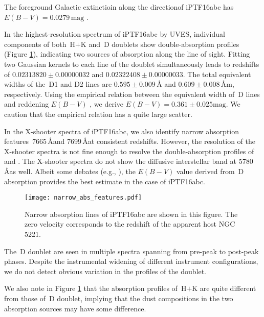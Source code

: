 \documentclass[twocolumn]{aastex61}
\begin{document}
The foreground Galactic extinctioin along the directionof iPTF16abc
has $E(B-V)=0.0279\,\textrm{mag}$ \citep{2011ApJ...737..103S}.

In the highest-resolution spectrum of iPTF16abc by UVES, individual
components of both \,H$+$K and \,D doublets show
double-absorption profiles (Figure \ref{fig:narrow_features}),
indicating two sources of absorption along the line of sight. Fitting
two Gaussian kernels to each line of the  doublet
simultaneously leads to redshifts of $0.02313820\pm0.00000032$ and
$0.02322408\pm0.00000033$. The total equivalent widths of the
\,D1 and D2 lines are $0.595\pm0.009\,\textrm{\AA}$ and
$0.609\pm0.008\,\textrm{\AA}$m, respectively. Using the empirical
relation between the equivalent width of \,D lines and
reddening $E(B-V)$ \citep{2012MNRAS.426.1465P}, we derive
$E(B-V)=0.361\pm0.025\textrm{mag}$. We caution that the empirical
relation has a quite large scatter.

In the X-shooter spectra of iPTF16abc, we also identify narrow
absorption features \,7665\,\AA and 7699\,\AA at consistent
redshifts. However, the resolution of the X-shooter spectra is not
fine enough to resolve the double-absorption profiles of 
and . The X-shooter spectra do not show the diffusive
interstellar band at 5780\,\AA as well.  Albeit some debates (e.g.,
\citealt{2013ApJ...779...38P}), the $E(B-V)$ value derived from
\,D absorption provides the best estimate in the case of
iPTF16abc.

\begin{figure}[htb]
  \centering
  \texttt{[image: narrow\_abs\_features.pdf]}
  \caption{Narrow absorption lines of iPTF16abc are shown in this
    figure. The zero velocity corresponds to the redshift of the
    apparent host NGC\,5221.}
  \label{fig:narrow_features}
\end{figure}

The \,D doublet are seen in multiple spectra spanning
from pre-peak to post-peak phases. Despite the instrumental widening of
different instrument configurations, we do not detect obvious variation
in the profiles of the doublet.

We also note in Figure \ref{fig:narrow_features} that the absorption
profiles of \,H$+$K are quite different from those of \,D
doublet, implying that the dust compositions in the two absorption sources
may have some difference.
\end{document}
